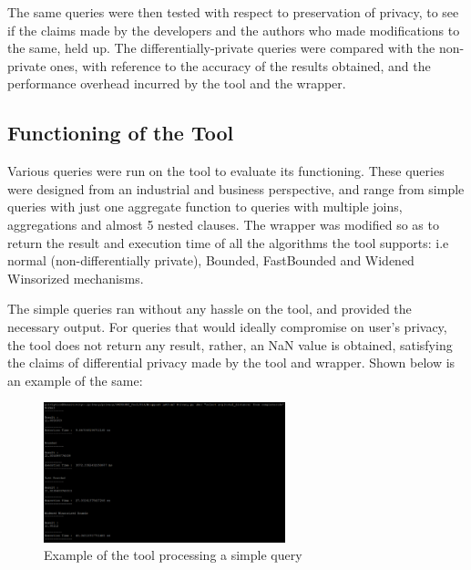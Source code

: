 \documentclass[acmsmall]{acmart}
\begin{document}
The same queries were then tested with respect to preservation of privacy, to see if the claims made by the developers and the authors who made modifications to the same, held up. The differentially-private queries were compared with the non-private ones, with reference to the accuracy of the results obtained, and the performance overhead incurred by the tool and the wrapper.


\subsection{Functioning of the Tool}\label{4.3}
Various queries were run on the tool to evaluate its functioning. These queries were designed from an industrial and business perspective, and range from simple queries with just one aggregate function to queries with multiple joins, aggregations and almost 5 nested clauses. The wrapper was modified so as to return the result and execution time of all the algorithms the tool supports: i.e normal (non-differentially private), Bounded, FastBounded and Widened Winsorized mechanisms.

The simple queries ran without any hassle on the tool, and provided the necessary output. For queries that would ideally compromise on user’s privacy, the tool does not return any result, rather, an NaN value is obtained, satisfying the claims of differential privacy made by the tool and wrapper.
Shown below is an example of the same:

\begin{figure}[htp]
    \centering
    \includegraphics[width=7cm]{Fig 4.3.1.png}
    \caption{Example of the tool processing a simple query}
    \label{fig:4.3.1}
\end{figure}
\end{document}
